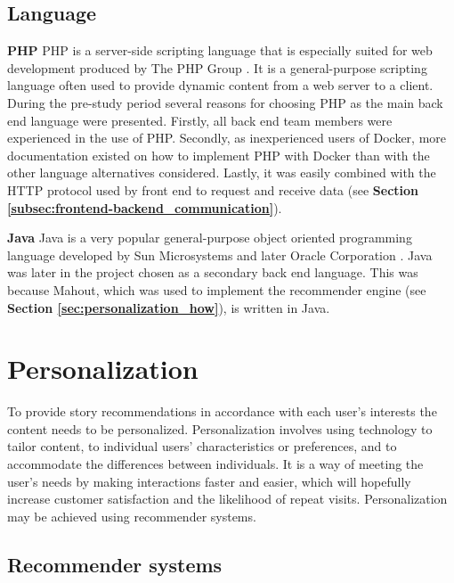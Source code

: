 \subsection{Language}
\label{subsec:backend_language}
\textbf{PHP}\newline
PHP is a server-side scripting language that is especially suited for web development produced by The PHP Group \cite{HM8}. It is a general-purpose scripting language often used to provide dynamic content from a web server to a client. During the pre-study period several reasons for choosing PHP as the main back end language were presented. Firstly, all back end team members were experienced in the use of PHP. Secondly, as inexperienced users of Docker, more documentation existed on how to implement PHP with Docker than with the other language alternatives considered.  Lastly, it was easily combined with the HTTP protocol used by front end to request and receive data (see \textbf{Section \ref{subsec:frontend-backend_communication}}).\newline

\noindent\textbf{Java}\newline
Java is a very popular general-purpose object oriented programming language developed by Sun Microsystems and later Oracle Corporation \cite{HM9}. Java was later in the project chosen as a secondary back end language. This was because Mahout, which was used to implement the recommender engine (see \textbf{Section \ref{sec:personalization_how}}), is written in Java.  


\section{Personalization}
\label{sec:personalization_algorithms}

To provide story recommendations in accordance with each user’s interests the content needs to be personalized. Personalization involves using technology to tailor content, to individual users’ characteristics or preferences, and to accommodate the differences between individuals. It is a way of meeting the user’s needs by making interactions faster and easier, which will hopefully increase customer satisfaction and the likelihood of repeat visits. Personalization may be achieved using recommender systems.

\subsection{Recommender systems}

